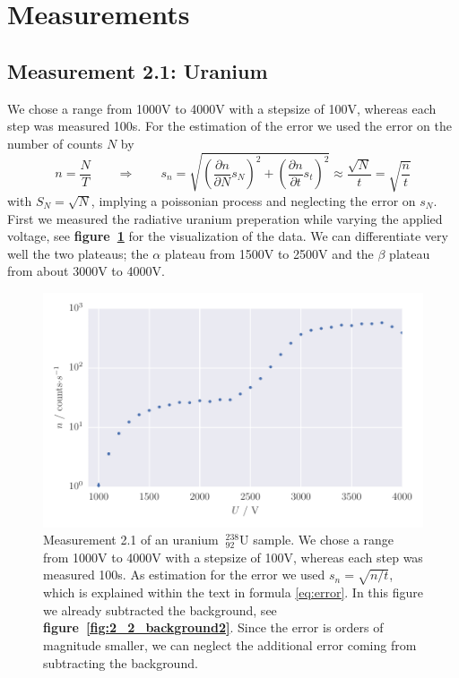\section{Measurements}
\label{sec:measurements} 
\subsection{Measurement 2.1: Uranium}
\label{subsec:uranium}
We chose a range from 1000V to 4000V with a stepsize of 100V, whereas each step was measured 100s. 
For the estimation of the error we used the error on the number of counts $N$ by
\begin{equation}
n = \frac{N}{T} \qquad \Rightarrow \qquad s_n =\sqrt{\left ( \frac{\partial n}{\partial N} s_N \right )^2 + \left (\frac{\partial n}{\partial t}s_t \right)^2 }
\approx \frac{\sqrt{N}}{t} = \sqrt{\frac{n}{t}}
\label{eq:error}
\end{equation}
with $S_N=\sqrt{N}$, implying a poissonian process and neglecting the error on $s_N$.
First we measured the radiative uranium preperation while varying the 
applied voltage, see \textbf{figure~\ref{fig:2_1_uranium}} for the visualization 
of the data. We can differentiate very well the two plateaus;
the $\alpha$ plateau from 1500V to 2500V and the  $\beta$ plateau from about 3000V to 4000V.
\begin{figure}[H]
    \centering
    \includegraphics[width=\linewidth]{analysis/figures/2_1_uranium}
    \caption{Measurement 2.1 of an uranium $\mathrm{~^{238}_{92}U}$ sample. We chose a range from 1000V to 4000V
    with a stepsize of 100V, whereas each step was measured 100s. As estimation for the
    error we used $s_n=\sqrt{n / t}$, which is explained within the text in formula \eqref{eq:error}. In this figure 
    we already subtracted the background, see \textbf{figure~\ref{fig:2_2_background2}}. Since 
    the error is orders of magnitude smaller, we can neglect the additional error coming from subtracting the background. }
    \label{fig:2_1_uranium}
\end{figure}
